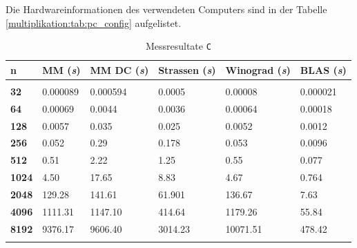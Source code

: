 Die Hardwareinformationen des verwendeten Computers sind in der Tabelle \ref{multiplikation:tab:pc_config} aufgelistet.


\begin{table}
			 \begin{center}
					 \begin{tabular}{l l l l l l}
							 \hline
							 \hline
							 \textbf{n} & \textbf{MM (\textit{s})} &  \textbf{MM DC (\textit{s})} & \textbf{Strassen (\textit{s})}  & \textbf{Winograd (\textit{s})} & \textbf{BLAS (\textit{s})} \\
							 \hline
							 \multicolumn{6}{c}{} \\
							 \textbf{32}   & 0.000089 & 0.000594 & 0.0005 & 0.00008 & 0.000021  \\
							 \textbf{64}   & 0.00069  & 0.0044   & 0.0036  & 0.00064 & 0.00018   \\
							 \textbf{128}  & 0.0057   & 0.035    & 0.025   & 0.0052  & 0.0012    \\
							 \textbf{256}  & 0.052    & 0.29     & 0.178    & 0.053   & 0.0096     \\
							 \textbf{512}  & 0.51     & 2.22     & 1.25    & 0.55    & 0.077     \\
							 \textbf{1024} & 4.50     & 17.65    & 8.83    & 4.67    & 0.764     \\
							 \textbf{2048} & 129.28   & 141.61   & 61.901   & 136.67  & 7.63      \\
							 \textbf{4096} & 1111.31  & 1147.10  & 414.64  & 1179.26 & 55.84     \\
							 \textbf{8192} & 9376.17  & 9606.40  & 3014.23  & 10071.51& 478.42     \\
							 \multicolumn{6}{c}{} \\
							 \hline
							 \hline
					 \end{tabular}
			 \end{center}
			 \caption{Messresultate \texttt{C}}
			 \label{multiplikation:tab:messung_C}
	 \end{table}



